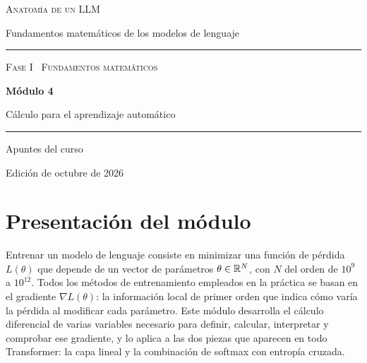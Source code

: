 \documentclass[11pt,a4paper,twoside,openany]{book}
\begin{document}
\frontmatter
\begin{titlepage}
\centering
\vspace*{2.5cm}
{\large\scshape Anatomía de un LLM}\par
\vspace{0.4cm}
{\normalsize Fundamentos matemáticos de los modelos de lenguaje}\par
\vspace{2.2cm}
\rule{\textwidth}{0.8pt}\par\vspace{0.5cm}
{\small\scshape Fase I \textperiodcentered\ Fundamentos matemáticos}\par\vspace{0.3cm}
{\Huge\bfseries Módulo 4\par}\vspace{0.3cm}
{\LARGE Cálculo para el aprendizaje automático\par}
\vspace{0.5cm}\rule{\textwidth}{0.4pt}\par
\vspace{1.6cm}
{\large Apuntes del curso}\par
\vfill
{\small Edición de octubre de 2026}\par
\end{titlepage}

\raggedbottom
\chapter*{Presentación del módulo}

Entrenar un modelo de lenguaje consiste en minimizar una función de pérdida $L(\theta)$ que depende de un vector de parámetros $\theta\in\mathbb{R}^{N}$, con $N$ del orden de $10^{9}$ a $10^{12}$. Todos los métodos de entrenamiento empleados en la práctica se basan en el gradiente $\nabla L(\theta)$: la información local de primer orden que indica cómo varía la pérdida al modificar cada parámetro. Este módulo desarrolla el cálculo diferencial de varias variables necesario para definir, calcular, interpretar y comprobar ese gradiente, y lo aplica a las dos piezas que aparecen en todo Transformer: la capa lineal y la combinación de softmax con entropía cruzada.
\end{document}
